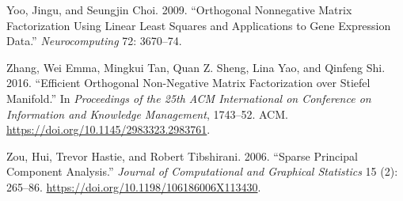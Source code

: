 \documentclass[
]{article}
\newlength{\cslhangindent}
\newenvironment{CSLReferences}[2] %
 {\begin{list}{}{%
  \setlength{\itemindent}{0pt}
  \setlength{\leftmargin}{0pt}
  \setlength{\parsep}{0pt}
  \ifodd #1
   \setlength{\leftmargin}{\cslhangindent}
   \setlength{\itemindent}{-1\cslhangindent}
  \fi
  \setlength{\itemsep}{#2\baselineskip}}}
 {\end{list}}
\begin{document}
\begin{CSLReferences}{1}{0}
Yoo, Jingu, and Seungjin Choi. 2009. {``Orthogonal Nonnegative Matrix Factorization Using Linear Least Squares and Applications to Gene Expression Data.''} \emph{Neurocomputing} 72: 3670--74.

Zhang, Wei Emma, Mingkui Tan, Quan Z. Sheng, Lina Yao, and Qinfeng Shi. 2016. {``Efficient Orthogonal Non-Negative Matrix Factorization over Stiefel Manifold.''} In \emph{Proceedings of the 25th ACM International on Conference on Information and Knowledge Management}, 1743--52. {ACM}. \url{https://doi.org/10.1145/2983323.2983761}.

Zou, Hui, Trevor Hastie, and Robert Tibshirani. 2006. {``Sparse Principal Component Analysis.''} \emph{Journal of Computational and Graphical Statistics} 15 (2): 265--86. \url{https://doi.org/10.1198/106186006X113430}.

\end{CSLReferences}
\end{document}
